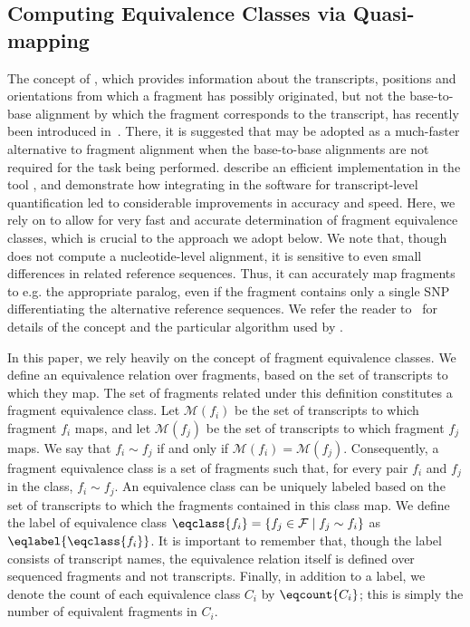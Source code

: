 \subsection{Computing Equivalence Classes via Quasi-mapping}
\label{subsec:quasimapping_equiv_classes}

The concept of \qm, which provides information about the transcripts, positions and orientations from which a fragment has possibly originated, but not the base-to-base alignment by which the fragment corresponds to the transcript, has recently been introduced in~\citet{rapmap}. There, it is suggested that \qm may be adopted as a much-faster alternative to fragment alignment when the base-to-base alignments are not required for the task being performed. \citeauthor{rapmap} describe an efficient implementation \qm in the tool \rapmap, and demonstrate how integrating \qm in the \sailfish software for transcript-level quantification led to considerable improvements in accuracy and speed. Here, we rely on \qm to allow for very fast and accurate determination of fragment equivalence classes, which is crucial to the approach we adopt below. We note that, though \qm does not compute a nucleotide-level alignment, it is sensitive to even small differences in related reference sequences.  Thus, it can accurately map fragments to e.g. the appropriate paralog, even if the fragment contains only a single SNP differentiating the alternative reference sequences.  We refer the reader to~\citep{rapmap} for details of the \qm concept and the particular algorithm used by \rapmap.

In this paper, we rely heavily on the concept of fragment equivalence classes. We define an equivalence relation over fragments, based on the set of transcripts to which they map.  The set of fragments related under this definition constitutes a fragment equivalence class.  Let $\mathcal{M}\left(f_i\right)$ be the set of transcripts to which fragment $f_i$ maps, and let $\mathcal{M}\left(f_j\right)$ be the set of transcripts to which fragment $f_j$ maps.  We say that $f_i \sim f_j$ if and only if $\mathcal{M}\left(f_i\right) = \mathcal{M}\left(f_j\right)$. Consequently, a fragment equivalence class is a set of fragments such that, for every pair $f_i$ and $f_j$ in the class, $f_i \sim f_j$. An equivalence class can be uniquely labeled based on the set of transcripts to which the fragments contained in this class map.  We define the label of equivalence class $\eqclass{f_i} = \{ f_j \in \mathcal{F} \mid f_j \sim f_i\}$ as $\eqlabel{\eqclass{f_i}}$.  It is important to remember that, though the label consists of transcript names, the equivalence relation itself is defined over sequenced fragments and not transcripts.  Finally, in addition to a label, we denote the count of each equivalence class $C_i$ by $\eqcount{C_i}$; this is simply the number of equivalent fragments in $C_i$.
    
